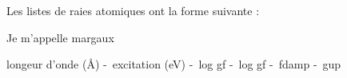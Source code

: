 \documentclass{article}
\begin{document}
 Les listes de raies atomiques ont la forme suivante :  \newline

 Je m'appelle margaux 

 longeur d'onde (Å) -\ excitation (eV) -\ log gf -\ log gf -\ fdamp -\ gup \newline

\end{document}
